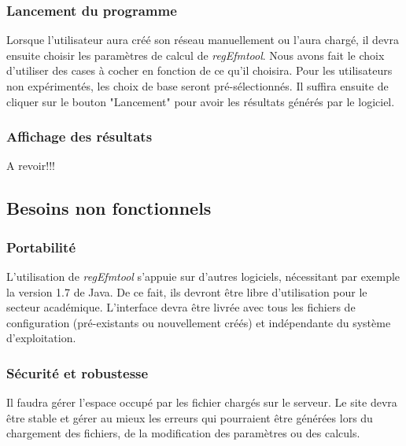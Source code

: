 \subsubsection{Lancement du programme}
Lorsque l'utilisateur aura créé son réseau manuellement ou l'aura chargé, il devra ensuite choisir les paramètres de calcul de \textit{regEfmtool}. Nous avons fait le choix d'utiliser des cases à cocher en fonction de ce qu'il choisira. Pour les utilisateurs non expérimentés, les choix de base seront pré-sélectionnés. Il suffira ensuite de cliquer sur le bouton "Lancement" pour avoir les résultats générés par le logiciel.

\subsubsection{Affichage des résultats}
A revoir!!!


\subsection{Besoins non fonctionnels}

\subsubsection{Portabilité}
L'utilisation de \textit{regEfmtool} s'appuie sur d'autres logiciels, nécessitant par exemple la version 1.7 de Java. De ce fait, ils devront être libre d'utilisation pour le secteur académique. L'interface devra être livrée avec tous les fichiers de configuration (pré-existants ou nouvellement créés) et indépendante du système d'exploitation. 

\subsubsection{Sécurité et robustesse}
Il faudra gérer l'espace occupé par les fichier chargés sur le serveur. Le site devra être stable et gérer au mieux les erreurs qui pourraient être générées lors du chargement des fichiers, de la modification des paramètres ou des calculs. %

